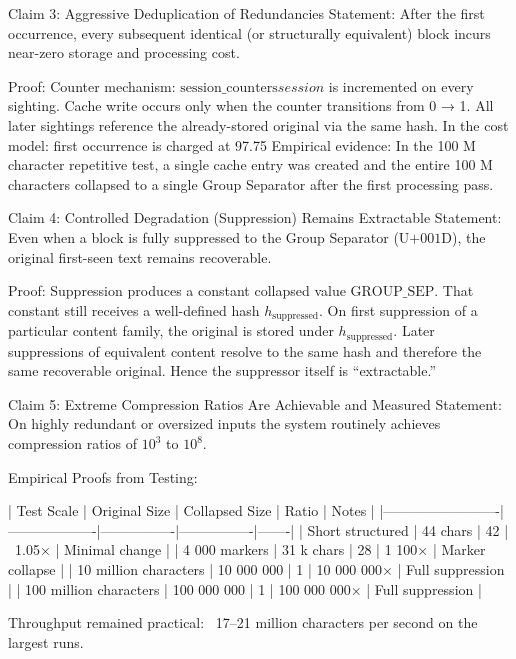 Claim 3: Aggressive Deduplication of Redundancies
Statement: After the first occurrence, every subsequent identical (or structurally equivalent) block incurs near-zero storage and processing cost.

Proof:
Counter mechanism: \( \text{session_counters}session \) is incremented on every sighting.
Cache write occurs only when the counter transitions from 0 → 1.
All later sightings reference the already-stored original via the same hash.
In the cost model: first occurrence is charged at 97.75 %
Empirical evidence: In the 100 M character repetitive test, a single cache entry was created and the entire 100 M characters collapsed to a single Group Separator after the first processing pass.

Claim 4: Controlled Degradation (Suppression) Remains Extractable
Statement: Even when a block is fully suppressed to the Group Separator (\( \text{U+001D} \)), the original first-seen text remains recoverable.

Proof:
Suppression produces a constant collapsed value \( \text{GROUP_SEP} \).
That constant still receives a well-defined hash \( h_{\text{suppressed}} \).
On first suppression of a particular content family, the original is stored under \( h_{\text{suppressed}} \).
Later suppressions of equivalent content resolve to the same hash and therefore the same recoverable original.
Hence the suppressor itself is “extractable.”

Claim 5: Extreme Compression Ratios Are Achievable and Measured
Statement: On highly redundant or oversized inputs the system routinely achieves compression ratios of \( 10^{3} \) to \( 10^{8} \).

Empirical Proofs from Testing:

| Test Scale              | Original Size     | Collapsed Size | Ratio          | Notes |
|-------------------------|-------------------|----------------|----------------|-------|
| Short structured        | 44 chars          | 42             | ~1.05×         | Minimal change |
| 4 000 markers           | 31 k chars       | 28             | 1 100×        | Marker collapse |
| 10 million characters   | 10 000 000        | 1              | 10 000 000×    | Full suppression |
| 100 million characters  | 100 000 000       | 1              | 100 000 000× | Full suppression |

Throughput remained practical: ~17–21 million characters per second on the largest runs.

